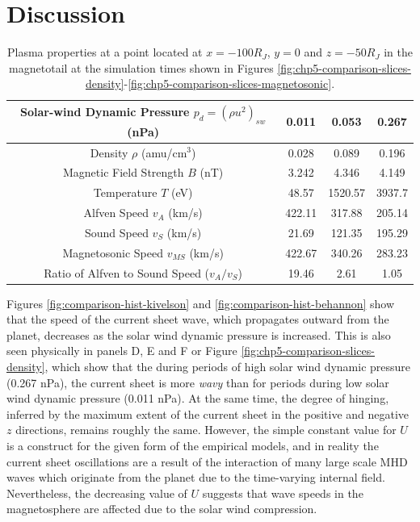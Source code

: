 \section{Discussion}

\begin{table}
    \centering
    \begin{tabular}{c|c|c|c}
    Solar-wind Dynamic Pressure $p_d=(\rho u^2)_{sw}$ (nPa)   &\textbf{0.011}  &\textbf{0.053}    &\textbf{0.267} \\
    \hline
    Density $\rho$ (amu/cm$^3$)     &0.028       &0.089       &0.196\\
    Magnetic Field Strength $B$ (nT)                &3.242       &4.346       &4.149\\
    Temperature $T$ (eV)                &48.57       &1520.57     &3937.7\\
    Alfven Speed $v_A$ (km/s)            &422.11      &317.88      &205.14\\
    Sound Speed $v_S$ (km/s)            &21.69       &121.35      &195.29\\
    Magnetosonic Speed $v_{MS}$ (km/s)         &422.67      &340.26      &283.23\\
    Ratio of Alfven to Sound Speed ($v_A/v_S$)               &19.46       &2.61        &1.05
    \end{tabular}
    \caption{Plasma properties at a point located at $x=-100 R_J$, $y=0$ and $z=-50 R_J$ in the magnetotail at the simulation times shown in Figures \protect\ref{fig:chp5-comparison-slices-density}-\ref{fig:chp5-comparison-slices-magnetosonic}.}
    \label{tab:plasma-properties-chp6lobes}
\end{table}

Figures \ref{fig:comparison-hist-kivelson} and \ref{fig:comparison-hist-behannon} show that the speed of the current sheet wave, which propagates outward from the planet, decreases as the solar wind dynamic pressure is increased. This is also seen physically in panels D, E and F or Figure \ref{fig:chp5-comparison-slices-density}, which show that the during periods of high solar wind dynamic pressure (0.267 nPa), the current sheet is more \emph{wavy} than for periods during low solar wind dynamic pressure (0.011 nPa). At the same time, the degree of hinging, inferred by the maximum extent of the current sheet in the positive and negative $z$ directions, remains roughly the same. However, the simple constant value for $U$ is a construct for the given form of the empirical models, and in reality the current sheet oscillations are a result of the interaction of many large scale MHD waves which originate from the planet due to the time-varying internal field. Nevertheless, the decreasing value of $U$ suggests that wave speeds in the magnetosphere are affected due to the solar wind compression. 

